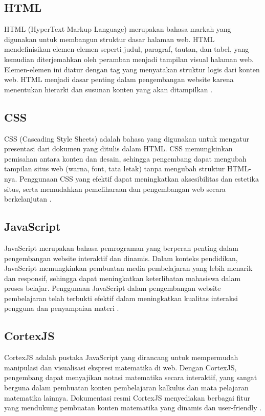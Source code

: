 \documentclass{file/KP-ITS}
\theoremstyle{definition}
\theoremstyle{definition}
\theoremstyle{plain}
\begin{document}
\subsection{HTML}

HTML (HyperText Markup Language) merupakan bahasa markah yang digunakan untuk membangun struktur dasar halaman web. HTML mendefinisikan elemen-elemen seperti judul, paragraf, tautan, dan tabel, yang kemudian diterjemahkan oleh peramban menjadi tampilan visual halaman web. Elemen-elemen ini diatur dengan tag yang menyatakan struktur logis dari konten web. HTML menjadi dasar penting dalam pengembangan website karena menentukan hierarki dan susunan konten yang akan ditampilkan \cite{sharma2024}.

\subsection{CSS}

CSS (Cascading Style Sheets) adalah bahasa yang digunakan untuk mengatur presentasi dari dokumen yang ditulis dalam HTML. CSS memungkinkan pemisahan antara konten dan desain, sehingga pengembang dapat mengubah tampilan situs web (warna, font, tata letak) tanpa mengubah struktur HTML-nya. Penggunaan CSS yang efektif dapat meningkatkan aksesibilitas dan estetika situs, serta memudahkan pemeliharaan dan pengembangan web secara berkelanjutan \cite{hasan2022}.

\subsection{JavaScript}

JavaScript merupakan bahasa pemrograman yang berperan penting dalam pengembangan website interaktif dan dinamis. Dalam konteks pendidikan, JavaScript memungkinkan pembuatan media pembelajaran yang lebih menarik dan responsif, sehingga dapat meningkatkan keterlibatan mahasiswa dalam proses belajar. Penggunaan JavaScript dalam pengembangan website pembelajaran telah terbukti efektif dalam meningkatkan kualitas interaksi pengguna dan penyampaian materi \cite{insana2021pengembangan}.

\subsection{CortexJS}

CortexJS adalah pustaka JavaScript yang dirancang untuk mempermudah manipulasi dan visualisasi ekspresi matematika di web. Dengan CortexJS, pengembang dapat menyajikan notasi matematika secara interaktif, yang sangat berguna dalam pembuatan konten pembelajaran kalkulus dan mata pelajaran matematika lainnya. Dokumentasi resmi CortexJS menyediakan berbagai fitur yang mendukung pembuatan konten matematika yang dinamis dan user-friendly \cite{cortexjs2025}.
\end{document}
